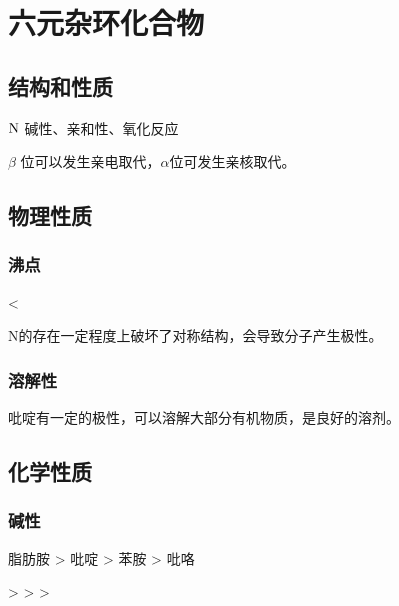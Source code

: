 \section{六元杂环化合物}

\subsection{结构和性质}

\begin{center}
\end{center}

$\ce{N}$ 碱性、亲和性、氧化反应

$\beta$ 位可以发生亲电取代，$\alpha$位可发生亲核取代。

\subsection{物理性质}

\subsubsection{沸点}

\begin{center}
     < 
\end{center}

N的存在一定程度上破坏了对称结构，会导致分子产生极性。

\subsubsection{溶解性}

吡啶有一定的极性，可以溶解大部分有机物质，是良好的溶剂。

\subsection{化学性质}

\subsubsection{碱性}

脂肪胺 > 吡啶 > 苯胺 > 吡咯

\begin{center}
     >  >  > 
\end{center}

